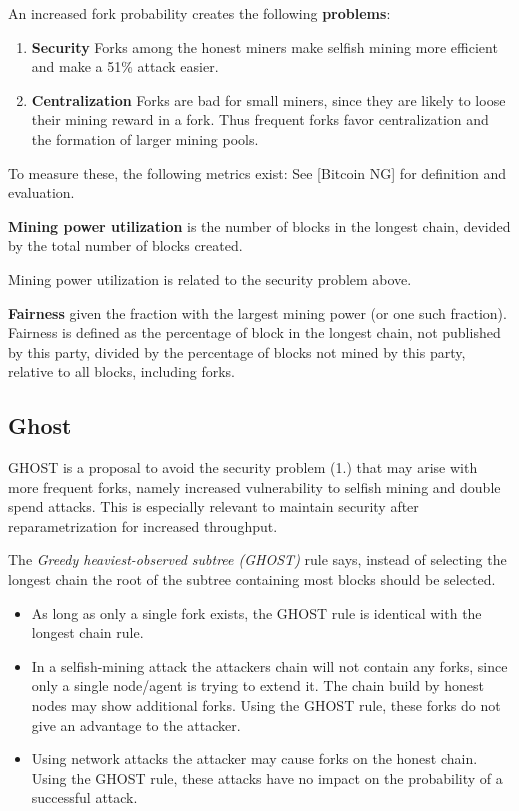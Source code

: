 An increased fork probability creates the following \textbf{problems}:
\begin{enumerate}
	\item \textbf{Security} Forks among the honest miners make selfish mining more efficient and make a 51\% attack easier. 
	\item \textbf{Centralization} Forks are bad for small miners, since they are likely to loose their mining reward in a fork. Thus frequent forks favor centralization and the formation of larger mining pools.
\end{enumerate}

To measure these, the following metrics exist: See [Bitcoin NG] for definition and evaluation.
\begin{definition}
\textbf{Mining power utilization} is the number of blocks in the longest chain, devided by the total number of blocks created. 
\end{definition}
Mining power utilization is related to the security problem above.

\begin{definition}
	\textbf{Fairness} given the fraction with the largest mining power (or one such fraction). Fairness is defined as the percentage of block in the longest chain, not published by this party, divided by the percentage of blocks not mined by this party, relative to all blocks, including forks.
\end{definition}

\subsection{Ghost}
GHOST is a proposal to avoid the security problem (1.) that may arise with more frequent forks, namely increased vulnerability to selfish mining and double spend attacks. This is especially relevant to maintain security after reparametrization for increased throughput.

\begin{definition} The \emph{Greedy heaviest-observed subtree (GHOST)} rule says, instead of selecting the longest chain the root of the subtree containing most blocks should be selected.	
\end{definition}

\begin{note}
	\begin{itemize}
		\item As long as only a single fork exists, the GHOST rule is identical with the longest chain rule.
		\item In a selfish-mining attack the attackers chain will not contain any forks, since only a single node/agent is trying to extend it. The chain build by honest nodes may show additional forks. Using the GHOST rule, these forks do not give an advantage to the attacker.
		\item Using network attacks the attacker may cause forks on the honest chain. Using the GHOST rule, these attacks have no impact on the probability of a successful attack.
	\end{itemize}
\end{note}

